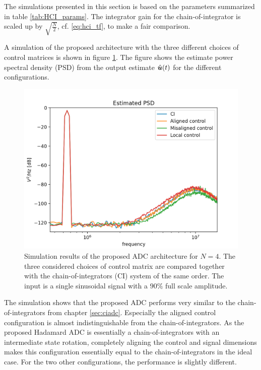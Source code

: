 The simulations presented in this section is based on the parameters summarized in table \ref{tab:HCI_params}. The integrator gain for the chain-of-integrator is scaled up by $\sqrt{\frac{N}{2}}$, cf. \ref{eq:hci_tf}, to make a fair comparison.


A simulation of the proposed architecture with the three different choices of control matrices is shown in figure \ref{fig:HCI_SIM1}. The figure shows the estimate power spectral density (PSD) from the output estimate $\hat{\bm{u}}(t)$ for the different configurations.
\begin{figure}[htbp]
    \centering
    \includegraphics[width=\linewidth]{figures/05hadamard/ideal_sim.png}
    \caption{Simulation results of the proposed ADC architecture for $N=4$. The three considered choices of control matrix are compared together with the chain-of-integrators (CI) system of the same order. The input is a single sinusoidal signal with a $90\%$ full scale amplitude. }
    \label{fig:HCI_SIM1}
\end{figure}
The simulation shows that the proposed ADC performs very similar to the chain-of-integrators from chapter \ref{sec:ciadc}. Especially the aligned control configuration is almost indistinguishable from the chain-of-integrators. As the proposed Hadamard ADC is essentially a chain-of-integrators with an intermediate state rotation, completely aligning the control and signal dimensions makes this configuration essentially equal to the chain-of-integrators in the ideal case. For the two other configurations, the performance is slightly different.


